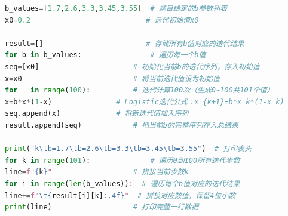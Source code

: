 \documentclass{article}
\begin{document}
	\begin{lstlisting}[language=Python, basicstyle=\small\ttfamily]
b_values=[1.7,2.6,3.3,3.45,3.55]  # 题目给定的b参数列表
x0=0.2                           # 迭代初始值x0

result=[]                        # 存储所有b值对应的迭代结果
for b in b_values:                # 遍历每一个b值
seq=[x0]                      # 初始化当前b的迭代序列，存入初始值
x=x0                          # 将当前迭代值设为初始值
for _ in range(100):          # 迭代计算100次（生成0~100共101个值）
x=b*x*(1-x)               # Logistic迭代公式：x_{k+1}=b*x_k*(1-x_k)
seq.append(x)             # 将新迭代值加入序列
result.append(seq)            # 把当前b的完整序列存入总结果

print("k\tb=1.7\tb=2.6\tb=3.3\tb=3.45\tb=3.55")  # 打印表头
for k in range(101):              # 遍历0到100所有迭代步数
line=f"{k}"                   # 拼接当前步数k
for i in range(len(b_values)):  # 遍历每个b值对应的迭代结果
line+=f"\t{result[i][k]:.4f}"  # 拼接对应数值，保留4位小数
print(line)                   # 打印完整一行数据
\end{lstlisting}
	
\end{document}
